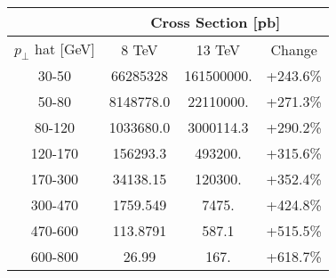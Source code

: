 \begin{table}[htp]
\centering

\begin{tabular}{|c|c|c|c|}
\hline
 & \multicolumn{3}{c|}{Cross Section [pb]} \\
\hline
$p_\perp$ hat [GeV] & 8 TeV & 13 TeV & Change \\
\hline
\hline
30-50   & 66285328      & 161500000.   & +243.6\% \\
50-80   &  8148778.0    &  22110000.   & +271.3\% \\
80-120  &  1033680.0    &   3000114.3  & +290.2\% \\
120-170 &   156293.3    &    493200.   & +315.6\% \\
170-300 &    34138.15   &    120300.   & +352.4\% \\
300-470 &     1759.549  &      7475.   & +424.8\% \\
470-600 &      113.8791 &       587.1  & +515.5\% \\
600-800 &       26.99   &       167.   & +618.7\% \\
\hline
\end{tabular}

\end{table}

